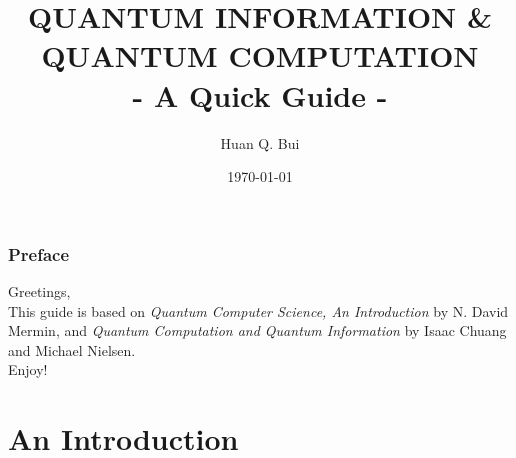 \documentclass{book}
\theoremstyle{definition}
\begin{document}
\begin{titlepage}\centering
 \clearpage
 \title{{\textsc{\textbf{QUANTUM INFORMATION \& QUANTUM COMPUTATION}}}\\ \smallskip - A Quick Guide - \\}
 \author{\bigskip Huan Q. Bui}
 \date{\today}
 \maketitle
 \thispagestyle{empty}
\end{titlepage}

\subsection*{Preface}

Greetings,\\

This guide is based on \textit{Quantum Computer Science, An Introduction} by N. David Mermin, and \textit{Quantum Computation and Quantum Information} by Isaac Chuang and Michael Nielsen. \\


Enjoy!

\newpage
\tableofcontents
\newpage



\chapter{An Introduction}

\newpage
\end{document}
